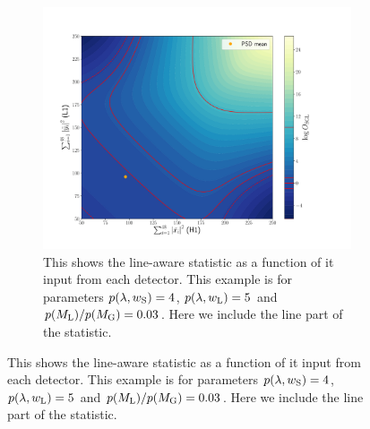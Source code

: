 \begin{figure}
\begin{subfigure}[h]{\linewidth}
\begin{minipage}{0.65\linewidth}
\includegraphics[width=1.\columnwidth]{C3_soap/lookup_linesmall.pdf}
\end{minipage}\hfill
\begin{minipage}{0.35\linewidth}
\caption{This shows the line-aware statistic as a function of it input from each detector. This example is for parameters $p(\lambda,w_{\rm{S}}) = 4$, $p(\lambda,w_{\rm{L}}) = 5$ and $p(M_{\rm{L}})/p(M_{\rm{G}}) = 0.03$. Here we include the line part of the statistic.}
\label{soap:las:detp:linesmall}
\end{minipage}
\end{subfigure}


\end{figure}
